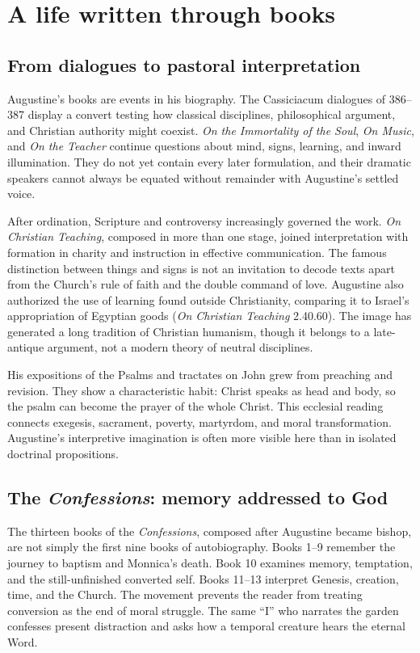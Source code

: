 \section{A life written through books}\label{sec:aug-writings}

\subsection{From dialogues to pastoral interpretation}

Augustine's books are events in his biography. The Cassiciacum dialogues of
386--387 display a convert testing how classical disciplines, philosophical
argument, and Christian authority might coexist. \emph{On the Immortality of
the Soul}, \emph{On Music}, and \emph{On the Teacher} continue questions about
mind, signs, learning, and inward illumination. They do not yet contain every
later formulation, and their dramatic speakers cannot always be equated
without remainder with Augustine's settled voice.

After ordination, Scripture and controversy increasingly governed the work.
\emph{On Christian Teaching}, composed in more than one stage,
joined interpretation with formation in charity and instruction in effective
communication. The famous distinction between things and signs is not an
invitation to decode texts apart from the Church's rule of faith and the
double command of love. Augustine also authorized the use of learning found
outside Christianity, comparing it to Israel's appropriation of Egyptian
goods (\emph{On Christian Teaching} 2.40.60). The image has generated a long
tradition of Christian humanism, though it belongs to a late-antique argument,
not a modern theory of neutral disciplines.

His expositions of the Psalms and tractates on John grew from preaching and
revision. They show a characteristic habit: Christ speaks as head and body,
so the psalm can become the prayer of the whole Christ. This ecclesial reading
connects exegesis, sacrament, poverty, martyrdom, and moral transformation.
Augustine's interpretive imagination is often more visible here than in
isolated doctrinal propositions.

\subsection{The \emph{Confessions}: memory addressed to God}

The thirteen books of the \emph{Confessions}, composed after Augustine became
bishop, are not simply the first nine books of autobiography. Books 1--9
remember the journey to baptism and Monnica's death. Book 10 examines memory,
temptation, and the still-unfinished converted self. Books 11--13 interpret
Genesis, creation, time, and the Church. The movement prevents the reader from
treating conversion as the end of moral struggle. The same “I” who narrates
the garden confesses present distraction and asks how a temporal creature
hears the eternal Word.

